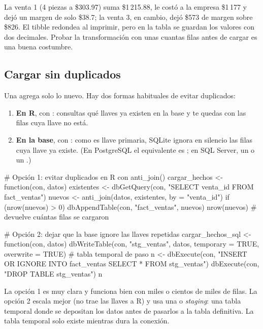 La venta 1 (4 piezas a \$303.97) suma \$1\,215.88, le costó a la empresa
\$1\,177 y dejó un margen de solo \$38.7; la venta 3, en cambio, dejó
\$573 de margen sobre \$826. El tibble redondea al imprimir, pero en la
tabla se guardan los valores con dos decimales. Probar la transformación
con unas cuantas filas antes de cargar es una buena costumbre.

\subsection{Cargar sin duplicados}

Una  agrega solo lo nuevo. Hay dos formas
habituales de evitar duplicados:

\begin{enumerate}
  \item \textbf{En R}, con : consultas qué llaves ya
        existen en la base y te quedas con las filas cuya llave no está.
  \item \textbf{En la base}, con : como
         es llave primaria, SQLite ignora en silencio las
        filas cuya llave ya existe. (En PostgreSQL el equivalente es
        ; en SQL Server, un
         o un .)
\end{enumerate}

\begin{rcode}
# Opción 1: evitar duplicados en R con anti_join()
cargar_hechos <- function(con, datos) {
  existentes <- dbGetQuery(con, "SELECT venta_id FROM fact_ventas")
  nuevos <- anti_join(datos, existentes, by = "venta_id")
  if (nrow(nuevos) > 0) dbAppendTable(con, "fact_ventas", nuevos)
  nrow(nuevos)                  # devuelve cuántas filas se cargaron
}

# Opción 2: dejar que la base ignore las llaves repetidas
cargar_hechos_sql <- function(con, datos) {
  dbWriteTable(con, "stg_ventas", datos, temporary = TRUE,
               overwrite = TRUE)          # tabla temporal de paso
  n <- dbExecute(con, "INSERT OR IGNORE INTO fact_ventas
                       SELECT * FROM stg_ventas")
  dbExecute(con, "DROP TABLE stg_ventas")
  n
}
\end{rcode}

La opción 1 es muy clara y funciona bien con miles o cientos de miles de
filas. La opción 2 escala mejor (no trae las llaves a R) y usa una
 o \emph{staging}: una tabla temporal donde se
depositan los datos antes de pasarlos a la tabla definitiva. La tabla
temporal solo existe mientras dura la conexión.

